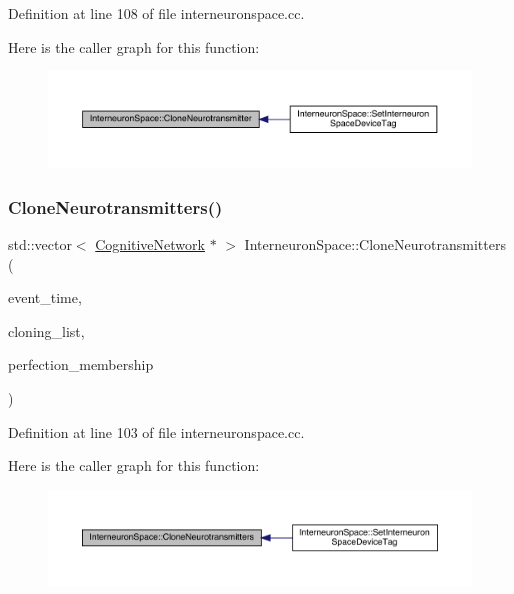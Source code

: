 Definition at line 108 of file interneuronspace.\+cc.

Here is the caller graph for this function\+:\nopagebreak
\begin{figure}[H]
\begin{center}
\leavevmode
\includegraphics[width=350pt]{class_interneuron_space_a96149bba4c6efd03586700a6fe86960a_icgraph}
\end{center}
\end{figure}
\mbox{\label{class_interneuron_space_a3defddf17eb839dbd799980f6116f895}} 
\subsubsection{\texorpdfstring{Clone\+Neurotransmitters()}{CloneNeurotransmitters()}}
{\footnotesize\ttfamily std\+::vector$<$ \hyperlink{class_cognitive_network}{Cognitive\+Network} $\ast$ $>$ Interneuron\+Space\+::\+Clone\+Neurotransmitters (\begin{DoxyParamCaption}\item[{std\+::chrono\+::time\+\_\+point$<$ \hyperlink{universe_8h_a0ef8d951d1ca5ab3cfaf7ab4c7a6fd80}{Clock} $>$}]{event\+\_\+time,  }\item[{std\+::vector$<$ \hyperlink{class_cognitive_network}{Cognitive\+Network} $\ast$$>$}]{cloning\+\_\+list,  }\item[{double}]{perfection\+\_\+membership }\end{DoxyParamCaption})}



Definition at line 103 of file interneuronspace.\+cc.

Here is the caller graph for this function\+:\nopagebreak
\begin{figure}[H]
\begin{center}
\leavevmode
\includegraphics[width=350pt]{class_interneuron_space_a3defddf17eb839dbd799980f6116f895_icgraph}
\end{center}
\end{figure}
\mbox{\label{class_interneuron_space_a26d98a0ae78ce363ab93e92cf0c973e7}} 
